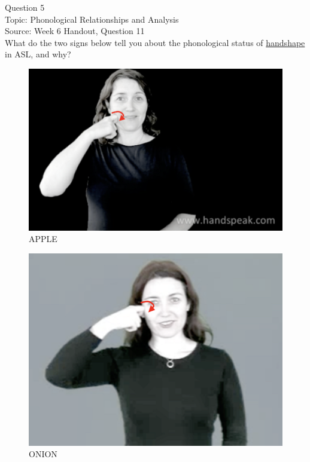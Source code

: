 \documentclass[12pt]{article}
\begin{document}
\newpage

{\large Question 5}\\

Topic: Phonological Relationships and Analysis\\
Source: Week 6 Handout, Question 11\\

What do the two signs below tell you about the phonological status of \underline{handshape} in ASL, and why?\\

\begin{figure}[H]
\includegraphics{../images/asl_apple.png}
\caption{APPLE}
\end{figure}
\begin{figure}[H]
\includegraphics{../images/asl_onion.png}
\caption{ONION}
\end{figure}
\end{document}
